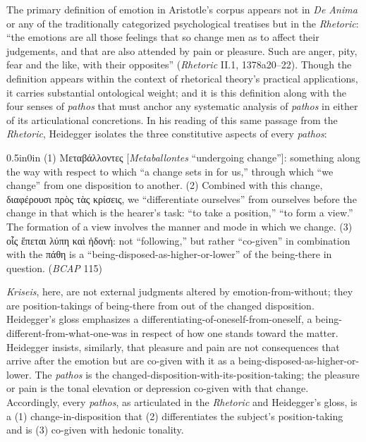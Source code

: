\documentclass{article}
\newcommand{\gk}[1]{{\greekfont #1}}
\begin{document}
The primary definition of emotion in Aristotle's corpus appears not in \textit{De Anima} or any of the traditionally categorized psychological treatises but in the \textit{Rhetoric}: ``the emotions are all those feelings that so change men as to affect their judgements, and that are also attended by pain or pleasure. Such are anger, pity, fear and the like, with their opposites'' (\textit{Rhetoric} II.1, 1378a20--22). Though the definition appears within the context of rhetorical theory's practical applications, it carries substantial ontological weight; and it is this definition along with the four senses of \textit{pathos} that must anchor any systematic analysis of \textit{pathos} in either of its articulational concretions. In his reading of this same passage from the \textit{Rhetoric}, Heidegger isolates the three constitutive aspects of every \textit{pathos}:
\begin{adjustwidth}{0.5in}{0in}
(1) \gk{Μεταβάλλοντες} [\textit{Metaballontes} ``undergoing change'']: something along the way with respect to which ``a change sets in for us,'' through which ``we change'' from one disposition to another. (2) Combined with this change, \gk{διαφέρουσι πρὸς τὰς κρίσεις}, we ``differentiate ourselves'' from ourselves before the change in that which is the hearer's task: ``to take a position,'' ``to form a view.'' The formation of a view involves the manner and mode in which we change. (3) \gk{οἷς ἕπεται λύπη καὶ ἡδονή}: not ``following,'' but rather ``co-given'' in combination with the \gk{πάθη} is a ``being-disposed-as-higher-or-lower'' of the being-there in question. (\textit{BCAP} 115)
\end{adjustwidth}
\textit{Kriseis}, here, are not external judgments altered by emotion-from-without; they are position-takings of being-there from out of the changed disposition. Heidegger's gloss emphasizes a differentiating-of-oneself-from-oneself, a being-different-from-what-one-was in respect of how one stands toward the matter. Heidegger insists, similarly, that pleasure and pain are not consequences that arrive after the emotion but are co-given with it as a being-disposed-as-higher-or-lower. The \textit{pathos} is the changed-disposition-with-its-position-taking; the pleasure or pain is the tonal elevation or depression co-given with that change. Accordingly, every \textit{pathos}, as articulated in the \textit{Rhetoric} and Heidegger's gloss, is a (1) change-in-disposition that (2) differentiates the subject's position-taking and is (3) co-given with hedonic tonality.
\end{document}
